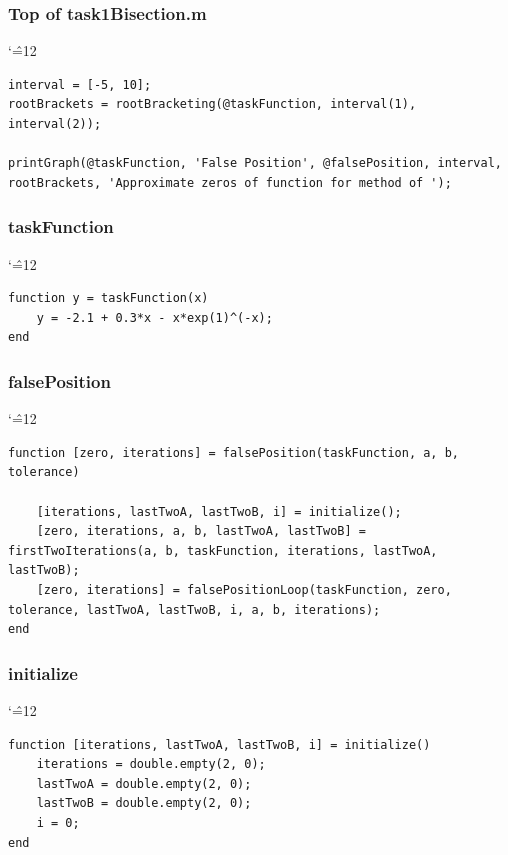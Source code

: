 \documentclass[12pt]{report}
\newenvironment{simplechar}{%
   \catcode`\^=12
}{}
\begin{document}
\subsubsection{Top of task1Bisection.m}
\begin{simplechar}
\begin{lstlisting}
interval = [-5, 10];
rootBrackets = rootBracketing(@taskFunction, interval(1), interval(2));

printGraph(@taskFunction, 'False Position', @falsePosition, interval, rootBrackets, 'Approximate zeros of function for method of ');
\end{lstlisting}
\end{simplechar}

\subsubsection{taskFunction}
\begin{simplechar}
\begin{lstlisting}
function y = taskFunction(x)
    y = -2.1 + 0.3*x - x*exp(1)^(-x);
end
\end{lstlisting}
\end{simplechar}

\newpage
\subsubsection{falsePosition}
\begin{simplechar}
\begin{lstlisting}
function [zero, iterations] = falsePosition(taskFunction, a, b, tolerance)

    [iterations, lastTwoA, lastTwoB, i] = initialize();
    [zero, iterations, a, b, lastTwoA, lastTwoB] = firstTwoIterations(a, b, taskFunction, iterations, lastTwoA, lastTwoB);
    [zero, iterations] = falsePositionLoop(taskFunction, zero, tolerance, lastTwoA, lastTwoB, i, a, b, iterations);
end
\end{lstlisting}
\end{simplechar}

\subsubsection{initialize}
\begin{simplechar}
\begin{lstlisting}
function [iterations, lastTwoA, lastTwoB, i] = initialize()
    iterations = double.empty(2, 0);
    lastTwoA = double.empty(2, 0);
    lastTwoB = double.empty(2, 0);
    i = 0;
end
\end{lstlisting}
\end{simplechar}
\end{document}
